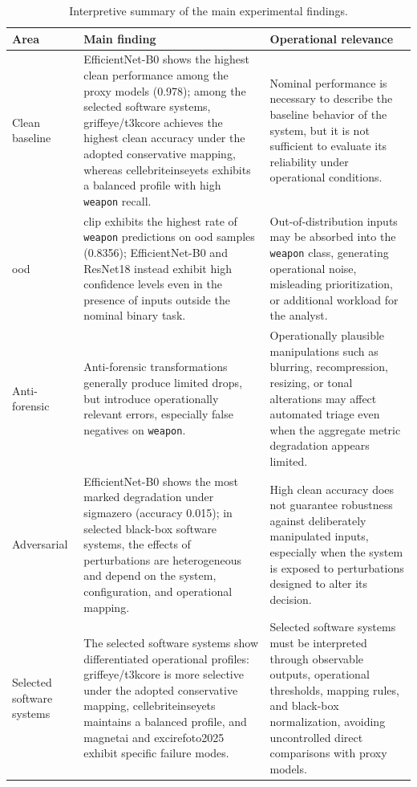\begin{table}[H]
\centering
\caption{Interpretive summary of the main experimental findings.}
\label{tab:conclusions-main-findings}
\footnotesize
\renewcommand{\arraystretch}{1.2}
\begin{tabularx}{\textwidth}{@{}p{} X X@{}}
\toprule
\textbf{Area} & \textbf{Main finding} & \textbf{Operational relevance} \\
\midrule
Clean baseline
& EfficientNet-B0 shows the highest clean performance among the proxy models
  (0.978); among the selected software systems, \gls{griffeye}/\gls{t3kcore}
  achieves the highest clean accuracy under the adopted conservative mapping,
  whereas \gls{cellebriteinseyets} exhibits a balanced profile with high
  \texttt{weapon} recall.
& Nominal performance is necessary to describe the baseline behavior of the
  system, but it is not sufficient to evaluate its reliability under operational
  conditions. \\

\gls{ood}
& \gls{clip} exhibits the highest rate of \texttt{weapon} predictions on
  \gls{ood} samples (0.8356); EfficientNet-B0 and ResNet18 instead exhibit high
  confidence levels even in the presence of inputs outside the nominal binary
  task.
& Out-of-distribution inputs may be absorbed into the \texttt{weapon} class,
  generating operational noise, misleading prioritization, or additional
  workload for the analyst. \\

Anti-forensic
& Anti-forensic transformations generally produce limited drops, but introduce
  operationally relevant errors, especially false negatives on
  \texttt{weapon}.
& Operationally plausible manipulations such as blurring, recompression,
  resizing, or tonal alterations may affect automated triage even when the
  aggregate metric degradation appears limited. \\

Adversarial
& EfficientNet-B0 shows the most marked degradation under \gls{sigmazero}
  (accuracy 0.015); in selected black-box software systems, the effects of
  perturbations are heterogeneous and depend on the system, configuration, and
  operational mapping.
& High clean accuracy does not guarantee robustness against deliberately
  manipulated inputs, especially when the system is exposed to perturbations
  designed to alter its decision. \\

Selected software systems
& The selected software systems show differentiated operational profiles:
  \gls{griffeye}/\gls{t3kcore} is more selective under the adopted conservative
  mapping, \gls{cellebriteinseyets} maintains a balanced profile, and
  \gls{magnetai} and \gls{excirefoto2025} exhibit specific failure modes.
& Selected software systems must be interpreted through observable outputs,
  operational thresholds, mapping rules, and black-box normalization, avoiding
  uncontrolled direct comparisons with proxy models. \\


\end{tabularx}
\end{table}
